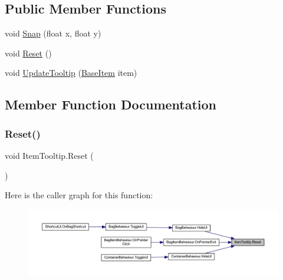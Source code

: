 \subsection*{Public Member Functions}
\begin{DoxyCompactItemize}
\item 
void \mbox{\hyperlink{class_item_tooltip_ae6eb8ab5acd326e431e46a3df5b76fa4}{Snap}} (float x, float y)
\item 
void \mbox{\hyperlink{class_item_tooltip_a4db0f30912c9b31ac912dbac40b17185}{Reset}} ()
\item 
void \mbox{\hyperlink{class_item_tooltip_a51e15cd0c208c14105cc8bedf452385b}{Update\+Tooltip}} (\mbox{\hyperlink{class_base_item}{Base\+Item}} item)
\end{DoxyCompactItemize}


\subsection{Member Function Documentation}
\mbox{\label{class_item_tooltip_a4db0f30912c9b31ac912dbac40b17185}} 
\subsubsection{\texorpdfstring{Reset()}{Reset()}}
{\footnotesize\ttfamily void Item\+Tooltip.\+Reset (\begin{DoxyParamCaption}{ }\end{DoxyParamCaption})}

Here is the caller graph for this function\+:
\nopagebreak
\begin{figure}[H]
\begin{center}
\leavevmode
\includegraphics[width=350pt]{class_item_tooltip_a4db0f30912c9b31ac912dbac40b17185_icgraph}
\end{center}
\end{figure}
\mbox{\label{class_item_tooltip_ae6eb8ab5acd326e431e46a3df5b76fa4}} 

